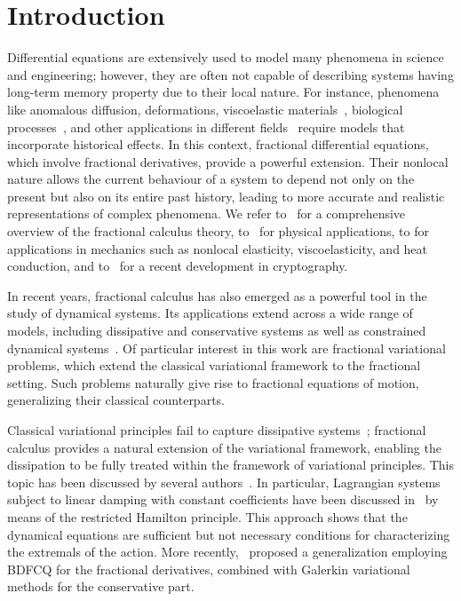 \documentclass[a4paper,10pt,reqno]{amsart}
\theoremstyle{definition}
\begin{document}
\section{Introduction}
Differential equations are extensively used to model many phenomena in science and engineering;  however, they are often not capable of describing systems having long-term memory property due to their local nature. For instance, phenomena like anomalous diffusion, deformations, viscoelastic materials~\cite{Bagley}, biological processes~\cite{Magin1, Magin2}, and other applications in different fields~\cite{Bonilla, Hilfer} require models that incorporate historical effects. In this context, fractional differential equations, which involve fractional derivatives, provide a powerful extension. Their nonlocal nature allows the current behaviour of a system to depend not only on the present but also on its entire past history, leading to more accurate and realistic representations of complex phenomena. 
We refer to~\cite{Oldham,TheBook,Igor,TheBook2} for a comprehensive overview of the fractional calculus theory, to~\cite{Tarasov} for physical applications, to \cite{chala} for applications in mechanics such as nonlocal elasticity, viscoelasticity, and 
heat conduction, and to~\cite{Sawar_Hussain_Ayaz_2025} for a recent development in cryptography.


In recent years, fractional calculus has also emerged as a powerful tool in the study of dynamical systems. Its applications extend across a wide range of models, including dissipative and conservative systems as well as constrained dynamical systems~\cite{Riewe,Riewe2,Klimek,Agra,Baleanu}. Of particular interest in this work are fractional variational problems, which extend the classical variational framework to the fractional setting. Such problems naturally give rise to fractional equations of motion, generalizing their classical counterparts.

Classical variational principles fail to capture dissipative systems~\cite{Bauer}; fractional calculus provides a natural extension of the variational framework, enabling the dissipation to be fully treated within the framework of variational principles.
This topic has been discussed by several authors~\cite{Riewe, Cresson2,Cresson3, JiOb1,JiOb2}. In particular, Lagrangian systems subject to linear  damping with constant coefficients have been discussed in~\cite{JiOb2} by means of the restricted Hamilton principle. This approach shows that the dynamical equations are sufficient but not necessary conditions for characterizing the extremals of the action. More recently,~\cite{HaJiOb} proposed a generalization employing BDFCQ for
the fractional derivatives, combined with Galerkin variational methods for the conservative part.
\end{document}
